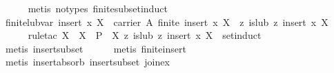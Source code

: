 \begin{isabellebody}
%
\isadelimproof
\ \ \ \ %
\endisadelimproof
%
\isatagproof
{}\isamarkupfalse%
\ {}metis\ {}no{}types{}\ finite{}subset{}induct{}%
\endisatagproof
{\isafoldproof}%
%
\isadelimproof
\isanewline
%
\endisadelimproof
\isanewline
\ \ \isamarkupfalse%
\ finite{}lub{}var{}\ {}{}{}insert\ x\ X{}\ {}\ carrier\ A{}\ finite\ {}insert\ x\ X{}{}\ {}\ {}z{}\ is{}lub\ z\ {}insert\ x\ X{}{}\isanewline
%
\isadelimproof
\ \ \ \ %
\endisadelimproof
%
\isatagproof
{}\isamarkupfalse%
\ {}rule{}tac\ X\ {}\ X\ \ P\ {}\ {}{}X{}\ {}z{}\ is{}lub\ z\ {}insert\ x\ X{}{}\ \ set{}induct{}\isanewline
\ \ \ \ \isamarkupfalse%
\ {}metis\ insert{}subset{}\isanewline
\ \ \ \ \isamarkupfalse%
\ {}metis\ finite{}insert{}\isanewline
\ \ \ \ \isamarkupfalse%
\ {}metis\ insert{}absorb{}\ insert{}subset\ join{}ex{}\isanewline

\end{isabellebody}
